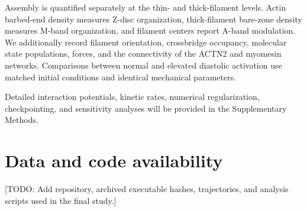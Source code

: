 \documentclass[11pt]{article}
\newcommand{\todo}[1]{\textcolor{red!70!black}{[TODO: #1]}}
\begin{document}
Assembly is quantified separately at the thin- and thick-filament levels.
Actin barbed-end density measures Z-disc organization, thick-filament bare-zone
density measures M-band organization, and filament centers report A-band
modulation. We additionally record filament orientation, crossbridge
occupancy, molecular state populations, forces, and the connectivity of the
ACTN2 and myomesin networks. Comparisons between normal and elevated
diastolic activation use matched initial conditions and identical mechanical
parameters.

Detailed interaction potentials, kinetic rates, numerical regularization,
checkpointing, and sensitivity analyses will be provided in the Supplementary
Methods.



\section*{Data and code availability}

\todo{Add repository, archived executable hashes, trajectories, and analysis
scripts used in the final study.}


% 
% 
\end{document}
